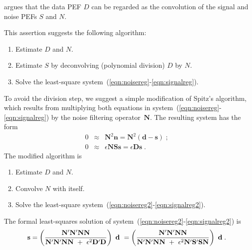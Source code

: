  \par
 \cite{TLE18-01-00550058} argues that the data PEF $D$ can
 be regarded as the convolution of the signal and noise PEFs
 $S$ and $N$. 

This assertion suggests the following
 algorithm:
 \begin{enumerate}
 \item Estimate $D$ and $N$.
 \item Estimate $S$ by deconvolving (polynomial division)
   $D$ by $N$.
 \item Solve the least-square system~(\ref{eqn:noisereg}-\ref{eqn:signalreg}).
 \end{enumerate}
 To avoid the division step, we suggest a simple modification of
 Spitz's algorithm, which results from multiplying both equations in
 system~(\ref{eqn:noisereg}-\ref{eqn:signalreg}) by the noise
 filtering operator~$\mathbf{N}$. The resulting system has the form
\begin{eqnarray}
  \label{eqn:noisereg2}
  0 & \approx &          \mathbf N^2 \mathbf n = \mathbf N^2 ( \mathbf d - \mathbf s)\;;
  \\
  \label{eqn:signalreg2}
  0 & \approx & \epsilon \mathbf N \mathbf S \mathbf s = \epsilon \mathbf D \mathbf s\;.
\end{eqnarray}
The modified algorithm is
\begin{enumerate}
\item Estimate $D$ and $N$.
\item Convolve $N$ with itself.
\item Solve the least-square system~(\ref{eqn:noisereg2}-\ref{eqn:signalreg2}).
\end{enumerate}
The formal least-squares solution of
system~(\ref{eqn:noisereg2}-\ref{eqn:signalreg2}) is
\begin{equation}
  \label{eqn:sfilter2}
  \mathbf s =
  \left(
    \mathbf {N' N' N N}
    \over
    \mathbf {N' N' N N} \ + \ \epsilon^2 \mathbf D'\mathbf D 
  \right) \ \mathbf d \  =
  \left(
    \mathbf {N' N' N N}
    \over
    \mathbf {N' N' N N} \ + \ \epsilon^2 \mathbf {N' S' S N} 
  \right) \ \mathbf d\;.
\end{equation}
